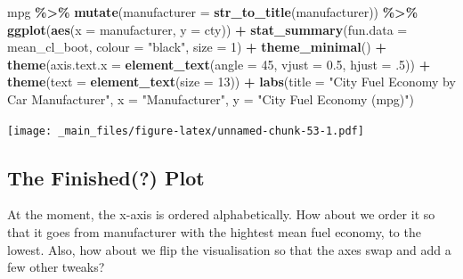 \documentclass[
]{book}
\newenvironment{Shaded}{\begin{snugshade}}{\end{snugshade}}
\newcommand{\AttributeTok}[1]{\textcolor[rgb]{0.13,0.29,0.53}{#1}}
\newcommand{\DecValTok}[1]{\textcolor[rgb]{0.00,0.00,0.81}{#1}}
\newcommand{\FloatTok}[1]{\textcolor[rgb]{0.00,0.00,0.81}{#1}}
\newcommand{\FunctionTok}[1]{\textcolor[rgb]{0.13,0.29,0.53}{\textbf{#1}}}
\newcommand{\NormalTok}[1]{#1}
\newcommand{\SpecialCharTok}[1]{\textcolor[rgb]{0.81,0.36,0.00}{\textbf{#1}}}
\newcommand{\StringTok}[1]{\textcolor[rgb]{0.31,0.60,0.02}{#1}}
\begin{document}
\begin{Shaded}
\begin{Highlighting}[]
\NormalTok{mpg }\SpecialCharTok{\%\textgreater{}\%}
  \FunctionTok{mutate}\NormalTok{(}\AttributeTok{manufacturer =} \FunctionTok{str\_to\_title}\NormalTok{(manufacturer)) }\SpecialCharTok{\%\textgreater{}\%}
  \FunctionTok{ggplot}\NormalTok{(}\FunctionTok{aes}\NormalTok{(}\AttributeTok{x =}\NormalTok{ manufacturer, }\AttributeTok{y =}\NormalTok{ cty)) }\SpecialCharTok{+} 
  \FunctionTok{stat\_summary}\NormalTok{(}\AttributeTok{fun.data =}\NormalTok{ mean\_cl\_boot, }\AttributeTok{colour =} \StringTok{"black"}\NormalTok{, }\AttributeTok{size =} \DecValTok{1}\NormalTok{) }\SpecialCharTok{+}
  \FunctionTok{theme\_minimal}\NormalTok{() }\SpecialCharTok{+}
  \FunctionTok{theme}\NormalTok{(}\AttributeTok{axis.text.x =} \FunctionTok{element\_text}\NormalTok{(}\AttributeTok{angle =} \DecValTok{45}\NormalTok{, }\AttributeTok{vjust =} \FloatTok{0.5}\NormalTok{, }\AttributeTok{hjust =}\NormalTok{ .}\DecValTok{5}\NormalTok{)) }\SpecialCharTok{+}
  \FunctionTok{theme}\NormalTok{(}\AttributeTok{text =} \FunctionTok{element\_text}\NormalTok{(}\AttributeTok{size =} \DecValTok{13}\NormalTok{)) }\SpecialCharTok{+}
  \FunctionTok{labs}\NormalTok{(}\AttributeTok{title =} \StringTok{"City Fuel Economy by Car Manufacturer"}\NormalTok{,}
       \AttributeTok{x =} \StringTok{"Manufacturer"}\NormalTok{, }
       \AttributeTok{y =} \StringTok{"City Fuel Economy (mpg)"}\NormalTok{)}
\end{Highlighting}
\end{Shaded}

\texttt{[image: \_main\_files/figure-latex/unnamed-chunk-53-1.pdf]}

\hypertarget{the-finished-plot}{%
\subsection{The Finished(?) Plot}\label{the-finished-plot}}

At the moment, the x-axis is ordered alphabetically. How about we order it so that it goes from manufacturer with the hightest mean fuel economy, to the lowest. Also, how about we flip the visualisation so that the axes swap and add a few other tweaks?
\end{document}
